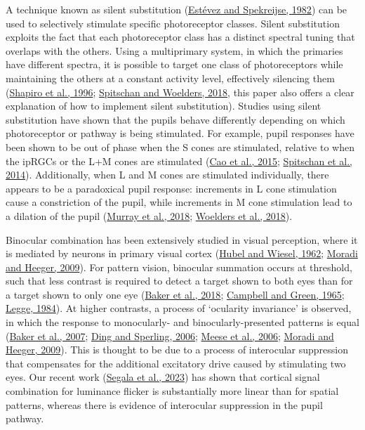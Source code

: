 \documentclass[
]{article}
\begin{document}
A technique known as silent substitution (\protect\hyperlink{ref-Estevez1982}{Estévez and Spekreijse, 1982}) can be used to selectively stimulate specific photoreceptor classes. Silent substitution exploits the fact that each photoreceptor class has a distinct spectral tuning that overlaps with the others. Using a multiprimary system, in which the primaries have different spectra, it is possible to target one class of photoreceptors while maintaining the others at a constant activity level, effectively silencing them (\protect\hyperlink{ref-Shapiro1996}{Shapiro et al., 1996}; \protect\hyperlink{ref-Spitschan2018}{Spitschan and Woelders, 2018}, this paper also offers a clear explanation of how to implement silent substitution). Studies using silent substitution have shown that the pupils behave differently depending on which photoreceptor or pathway is being stimulated. For example, pupil responses have been shown to be out of phase when the S cones are stimulated, relative to when the ipRGCs or the L+M cones are stimulated (\protect\hyperlink{ref-Cao2015}{Cao et al., 2015}; \protect\hyperlink{ref-Spitschan2014}{Spitschan et al., 2014}). Additionally, when L and M cones are stimulated individually, there appears to be a paradoxical pupil response: increments in L cone stimulation cause a constriction of the pupil, while increments in M cone stimulation lead to a dilation of the pupil (\protect\hyperlink{ref-Murray2018}{Murray et al., 2018}; \protect\hyperlink{ref-Woelders2018}{Woelders et al., 2018}).

Binocular combination has been extensively studied in visual perception, where it is mediated by neurons in primary visual cortex (\protect\hyperlink{ref-Hubel1962}{Hubel and Wiesel, 1962}; \protect\hyperlink{ref-Moradi2009}{Moradi and Heeger, 2009}). For pattern vision, binocular summation occurs at threshold, such that less contrast is required to detect a target shown to both eyes than for a target shown to only one eye (\protect\hyperlink{ref-Baker2018}{Baker et al., 2018}; \protect\hyperlink{ref-Campbell1965}{Campbell and Green, 1965}; \protect\hyperlink{ref-Legge1984}{Legge, 1984}). At higher contrasts, a process of `ocularity invariance' is observed, in which the response to monocularly- and binocularly-presented patterns is equal (\protect\hyperlink{ref-Baker2007}{Baker et al., 2007}; \protect\hyperlink{ref-Ding2006}{Ding and Sperling, 2006}; \protect\hyperlink{ref-Meese2006}{Meese et al., 2006}; \protect\hyperlink{ref-Moradi2009}{Moradi and Heeger, 2009}). This is thought to be due to a process of interocular suppression that compensates for the additional excitatory drive caused by stimulating two eyes. Our recent work (\protect\hyperlink{ref-Segala2023}{Segala et al., 2023}) has shown that cortical signal combination for luminance flicker is substantially more linear than for spatial patterns, whereas there is evidence of interocular suppression in the pupil pathway.
\end{document}

